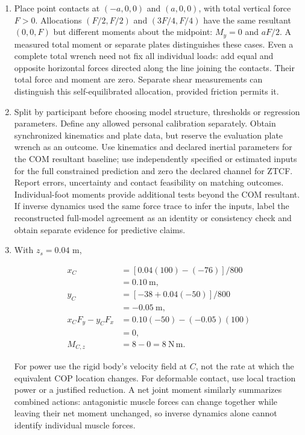 \begin{enumerate}
  They double-count the retained baseline. Moving supports or reevaluated velocity-dependent loads require recomputing the relevant terms, and any retained unilateral/sticking mode must pass its feasibility conditions.
\item
  Place point contacts at \((-a,0,0)\) and \((a,0,0)\), with total vertical force \(F>0\). Allocations \((F/2,F/2)\) and \((3F/4,F/4)\) have the same resultant \((0,0,F)\) but different moments about the midpoint: \(M_y=0\) and \(aF/2\). A measured total moment or separate plates distinguishes these cases. Even a complete total wrench need not fix all individual loads: add equal and opposite horizontal forces directed along the line joining the contacts. Their total force and moment are zero. Separate shear measurements can distinguish this self-equilibrated allocation, provided friction permits it.
\item
  Split by participant before choosing model structure, thresholds or regression parameters. Define any allowed personal calibration separately. Obtain synchronized kinematics and plate data, but reserve the evaluation plate wrench as an outcome. Use kinematics and declared inertial parameters for the COM resultant baseline; use independently specified or estimated inputs for the full constrained prediction and zero the declared channel for ZTCF. Report errors, uncertainty and contact feasibility on matching outcomes. Individual-foot moments provide additional tests beyond the COM resultant. If inverse dynamics used the same force trace to infer the inputs, label the reconstructed full-model agreement as an identity or consistency check and obtain separate evidence for predictive claims.
\item
  With \(z_s=0.04\) m,

  \[
  \begin{aligned}
  x_C&=[0.04(100)-(-76)]/800\\
  &=0.10\ \mathrm m,\\
  y_C&=[-38+0.04(-50)]/800\\
  &=-0.05\ \mathrm m,\\
  x_CF_y-y_CF_x&=0.10(-50)-(-0.05)(100)\\
  &=0,\\
  M_{C,z}&=8-0=8\ \mathrm{N\,m}.
  \end{aligned}
  \]

  For power use the rigid body's velocity field at \(C\), not the rate at which the equivalent COP location changes. For deformable contact, use local traction power or a justified reduction. A net joint moment similarly summarizes combined actions: antagonistic muscle forces can change together while leaving their net moment unchanged, so inverse dynamics alone cannot identify individual muscle forces.
\end{enumerate}
